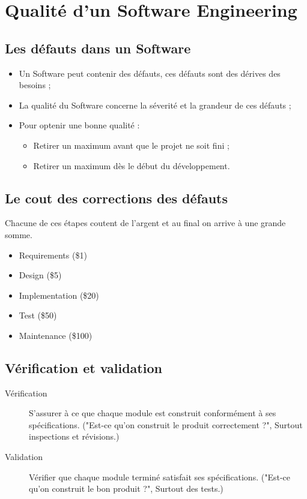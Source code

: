 \section{Qualité d'un Software Engineering}



\subsection{Les défauts dans un Software}
\begin{itemize}
    \item Un Software peut contenir des défauts, ces défauts sont des dérives des besoins ;
    \item La qualité du Software concerne la séverité et la grandeur de ces défauts ;
    \item Pour optenir une bonne qualité :
		\begin{itemize}
			\item Retirer un maximum avant que le projet ne soit fini ;
			\item Retirer un maximum dès le début du développement.
		\end{itemize}
\end{itemize}


\subsection{Le cout des corrections des défauts}
Chacune de ces étapes coutent de l'argent et au final on arrive à une grande somme.
\begin{itemize}
    \item Requirements (\$1)
	\item Design (\$5)
	\item Implementation (\$20)
	\item Test (\$50)
	\item Maintenance (\$100)
\end{itemize}



\subsection{Vérification et validation}
\begin{description}
    \item [Vérification] S'assurer à ce que chaque module est construit conformément à ses spécifications. ("Est-ce qu'on construit le produit correctement ?", Surtout inspections et révisions.)
    \item [Validation] Vérifier que chaque module terminé satisfait ses spécifications. ("Est-ce qu'on construit le bon produit ?", Surtout des tests.)
\end{description}



